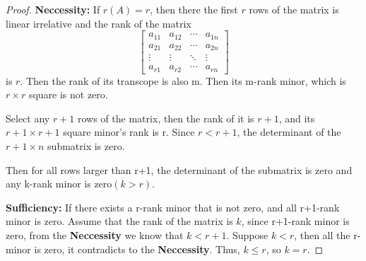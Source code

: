 \documentclass{article}
\theoremstyle{definition}
\begin{document}
\begin{proof}




    \textbf{Neccessity:}
    If $r(A)=r$, then there the first $r$ rows of the matrix 
    is linear irrelative and the rank of the matrix
    $$\begin{bmatrix}
        a_{11}&a_{12} & \cdots & a_{1n}\\
        a_{21} & a_{22} & \cdots & a_{2n}\\
        \vdots & \vdots & \ddots & \vdots\\
        a_{r1} & a_{r2} & \cdots & a_{rn}
    \end{bmatrix}$$
    is $r$. Then the rank of its transcope is also m. Then its m-rank minor, 
    which is $r\times r$ square is not zero.

    Select any $r+1$ rows of the matrix, then the rank 
    of it is $r+1$, and its $r+1\times r+1$ square minor's rank 
    is r. Since $r<r+1$, the determinant of the $r+1\times n$ submatrix 
    is zero.

    Then for all rows larger than r+1, the determinant of the submatrix
    is zero and any k-rank minor is zero$(k>r)$.

    \textbf{Sufficiency:}
    If there exists a r-rank minor that is not zero,
    and all r+1-rank minor is zero. Assume that the rank 
    of the matrix is $k$, since r+1-rank minor is zero, from the \textbf{Neccessity}
    we know that $k<r+1$. Suppose $k<r$, then all the r-minor is zero, it contradicts 
    to the \textbf{Neccessity}. Thus, $k\leq r$, so $k=r$.
\end{proof}








\newpage
\end{document}
